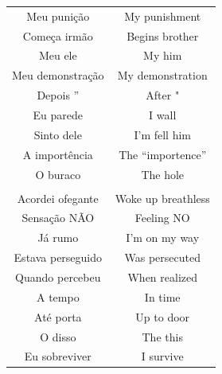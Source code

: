 \documentclass[12pt,fleqn]{article}
\begin{document}
\begin{table}[H]
\begin{tabular}{  c | c }
Meu punição                      &                                                My punishment           \\
Começa irmão                     &                                                Begins brother          \\
Meu ele                          &                                                My him                  \\
Meu demonstração                 &                                                My demonstration        \\
Depois ”                         &                                                After "                 \\
Eu parede                        &                                                I wall                  \\
Sinto dele                       &                                                I'm fell him            \\
A importência                    &                                                The ``importence''      \\
O buraco                         &                                                The hole                \\
  & \\
Acordei ofegante                 &                                                Woke up breathless    \\
Sensação NÃO                     &                                                Feeling NO              \\
Já rumo                          &                                                I'm on my way           \\
Estava perseguido                &                                                Was persecuted          \\
Quando percebeu                  &                                                When realized    \\
A tempo                          &                                                In time                 \\
Até porta                        &                                                Up to door              \\
O disso                          &                                                The this                    \\
Eu sobreviver                    &                                                I survive               \\

\end{tabular}
\end{table}
\end{document}

